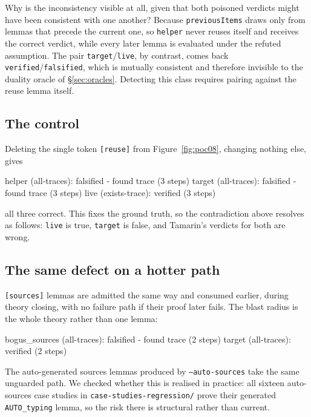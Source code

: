 \documentclass[version=preprint]{iacrcc}
\newcommand{\code}[1]{\texttt{\small #1}}
\theoremstyle{definition}
\theoremstyle{remark}
\begin{document}
Why is the inconsistency visible at all, given that both poisoned verdicts
might have been consistent with one another? Because \code{previousItems}
draws only from lemmas that precede the current one, so \code{helper} never
reuses itself and receives the correct verdict, while every later lemma is
evaluated under the refuted assumption. The pair \code{target}/\code{live}, by
contrast, comes back \code{verified}/\code{falsified}, which is mutually
consistent and therefore invisible to the duality oracle of
\S\ref{sec:oracles}. Detecting this class requires pairing against the reuse
lemma itself.

\subsection{The control}

Deleting the single token \code{[reuse]} from Figure~\ref{fig:poc08}, changing
nothing else, gives

\begin{outlisting}
	helper (all-traces):   falsified - found trace (3 steps)
	target (all-traces):   falsified - found trace (3 steps)
	live   (exists-trace): verified (3 steps)
\end{outlisting}

all three correct. This fixes the ground truth, so the contradiction above
resolves as follows: \code{live} is true, \code{target} is false, and Tamarin's
verdicts for both are wrong.

\subsection{The same defect on a hotter path}

\code{[sources]} lemmas are admitted the same way and consumed earlier, during
theory closing, with no failure path if their proof later fails. The blast
radius is the whole theory rather than one lemma:

\begin{outlisting}
	bogus_sources (all-traces): falsified - found trace (2 steps)
	target        (all-traces): verified (2 steps)
\end{outlisting}

The auto-generated sources lemmas produced by \code{--auto-sources} take the
same unguarded path. We checked whether this is realised in practice: all
sixteen auto-sources case studies in \code{case-studies-regression/} prove
their generated \code{AUTO\_typing} lemma, so the risk there is structural
rather than current.
\end{document}
